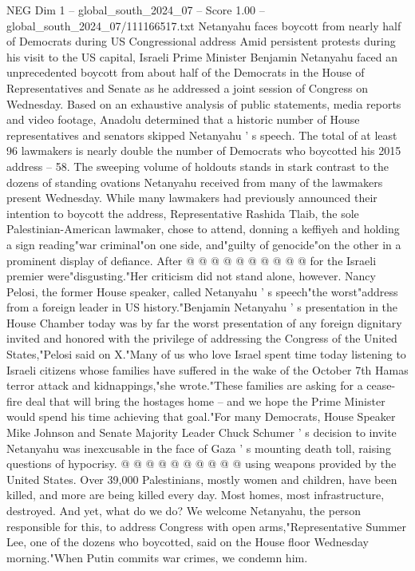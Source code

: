 \begin{textsample}{NEG Dim 1 – global\_south\_2024\_07 – Score 1.00 – global\_south\_2024\_07/111166517.txt}  \label{ex:f1_neg_390}
Netanyahu faces boycott from nearly half of Democrats during US Congressional address Amid persistent protests during his visit to the US capital, Israeli Prime Minister Benjamin Netanyahu faced an unprecedented boycott from about half of the Democrats in the House of Representatives and Senate as he addressed a joint session of Congress on Wednesday.
Based on an exhaustive analysis of public statements, media reports and video footage, Anadolu determined that a historic number of House representatives and senators skipped Netanyahu ' s speech.
The total of at least 96 lawmakers is nearly double the number of Democrats who boycotted his 2015 address -- 58.
The sweeping volume of holdouts stands in stark contrast to the dozens of standing ovations Netanyahu received from many of the lawmakers present Wednesday.
While many lawmakers had previously announced their intention to boycott the address, Representative Rashida Tlaib, the sole Palestinian-American lawmaker, chose to attend, donning a keffiyeh and holding a sign reading"war criminal"on one side, and"guilty of genocide"on the other in a prominent display of defiance.
After @ @ @ @ @ @ @ @ @ @ for the Israeli premier were"disgusting."Her criticism did not stand alone, however.
Nancy Pelosi, the former House speaker, called Netanyahu ' s speech"the worst"address from a foreign leader in US history."Benjamin Netanyahu ' s presentation in the House Chamber today was by far the worst presentation of any foreign dignitary invited and honored with the privilege of addressing the Congress of the United States,"Pelosi said on X."Many of us who love Israel spent time today listening to Israeli citizens whose families have suffered in the wake of the October 7th Hamas terror attack and kidnappings,"she wrote."These families are asking for a cease-fire deal that will bring the hostages home -- and we hope the Prime Minister would spend his time achieving that goal."For many Democrats, House Speaker Mike Johnson and Senate Majority Leader Chuck Schumer ' s decision to invite Netanyahu was inexcusable in the face of Gaza ' s mounting death toll, raising questions of hypocrisy. @ @ @ @ @ @ @ @ @ @ using weapons provided by the United States.
Over 39,000 Palestinians, mostly women and children, have been killed, and more are being killed every day.
Most homes, most infrastructure, destroyed.
And yet, what do we do?
We welcome Netanyahu, the person responsible for this, to address Congress with open arms,"Representative Summer Lee, one of the dozens who boycotted, said on the House floor Wednesday morning."When Putin commits war crimes, we condemn him.

\end{textsample}
